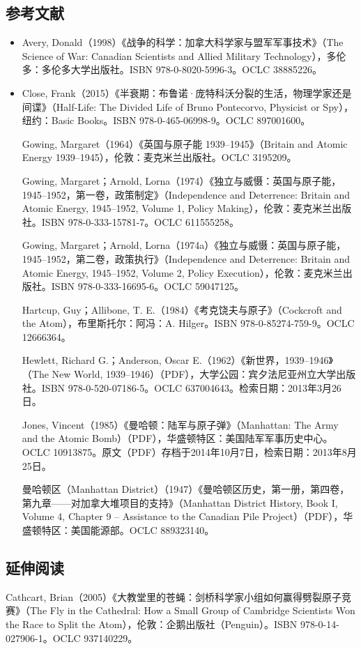 \subsection{参考文献}
\begin{itemize}
\item Avery, Donald（1998）《战争的科学：加拿大科学家与盟军军事技术》（The Science of War: Canadian Scientists and Allied Military Technology），多伦多：多伦多大学出版社。ISBN 978-0-8020-5996-3。OCLC 38885226。

\item Close, Frank（2015）《半衰期：布鲁诺·庞特科沃分裂的生活，物理学家还是间谍》（Half-Life: The Divided Life of Bruno Pontecorvo, Physicist or Spy），纽约：Basic Books。ISBN 978-0-465-06998-9。OCLC 897001600。

Gowing, Margaret（1964）《英国与原子能 1939–1945》（Britain and Atomic Energy 1939–1945），伦敦：麦克米兰出版社。OCLC 3195209。

Gowing, Margaret；Arnold, Lorna（1974）《独立与威慑：英国与原子能，1945–1952，第一卷，政策制定》（Independence and Deterrence: Britain and Atomic Energy, 1945–1952, Volume 1, Policy Making），伦敦：麦克米兰出版社。ISBN 978-0-333-15781-7。OCLC 611555258。

Gowing, Margaret；Arnold, Lorna（1974a）《独立与威慑：英国与原子能，1945–1952，第二卷，政策执行》（Independence and Deterrence: Britain and Atomic Energy, 1945–1952, Volume 2, Policy Execution），伦敦：麦克米兰出版社。ISBN 978-0-333-16695-6。OCLC 59047125。

Hartcup, Guy；Allibone, T. E.（1984）《考克饶夫与原子》（Cockcroft and the Atom），布里斯托尔：阿冯：A. Hilger。ISBN 978-0-85274-759-9。OCLC 12666364。

Hewlett, Richard G.；Anderson, Oscar E.（1962）《新世界，1939–1946》（The New World, 1939–1946）（PDF），大学公园：宾夕法尼亚州立大学出版社。ISBN 978-0-520-07186-5。OCLC 637004643。检索日期：2013年3月26日。

Jones, Vincent（1985）《曼哈顿：陆军与原子弹》（Manhattan: The Army and the Atomic Bomb）（PDF），华盛顿特区：美国陆军军事历史中心。OCLC 10913875。原文（PDF）存档于2014年10月7日，检索日期：2013年8月25日。

曼哈顿区（Manhattan District）（1947）《曼哈顿区历史，第一册，第四卷，第九章——对加拿大堆项目的支持》（Manhattan District History, Book I, Volume 4, Chapter 9 – Assistance to the Canadian Pile Project）（PDF），华盛顿特区：美国能源部。OCLC 889323140。
\end{itemize}

\subsection{延伸阅读}

Cathcart, Brian（2005）《大教堂里的苍蝇：剑桥科学家小组如何赢得劈裂原子竞赛》（The Fly in the Cathedral: How a Small Group of Cambridge Scientists Won the Race to Split the Atom），伦敦：企鹅出版社（Penguin）。ISBN 978-0-14-027906-1。OCLC 937140229。